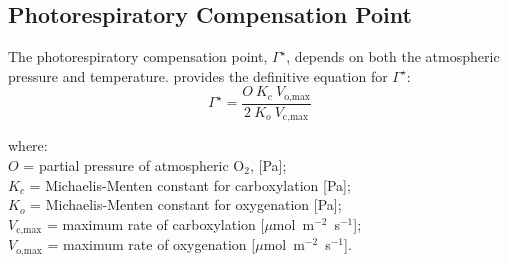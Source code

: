 \subsection{Photorespiratory Compensation Point}
\label{sec:gs}
%
The photorespiratory compensation point, $\Gamma^\star$, depends on both the atmospheric pressure and temperature.
\cite{bernacchi01} provides the definitive equation for $\Gamma^\star$:
\begin{equation}
\label{eq:gsbasic}
    \Gamma^\star = \frac{O\: K_c\: V_\text{o,max}}
                        {2\: K_o\: V_\text{c,max}}
\end{equation}

\noindent where:\\
\indent $O$ = partial pressure of atmospheric O$_2$, [Pa];\\
\indent $K_c$ = Michaelis-Menten constant for carboxylation [Pa];\\
\indent $K_o$ = Michaelis-Menten constant for oxygenation [Pa];\\
\indent $V_\text{c,max}$ = maximum rate of carboxylation [$\mu$mol~m$^{-2}$~s$^{-1}$];\\
\indent $V_\text{o,max}$ = maximum rate of oxygenation [$\mu$mol~m$^{-2}$~s$^{-1}$].\\

